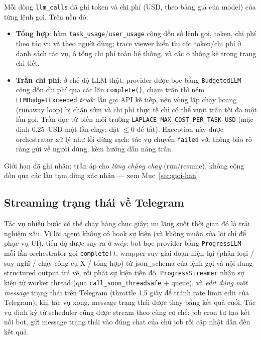 Mỗi dòng \texttt{llm\_calls} đã ghi token và chi phí (USD, theo bảng giá của
model) của từng lệnh gọi. Trên nền đó:

\begin{itemize}
  \item \textbf{Tổng hợp}: hàm \texttt{task\_usage}/\texttt{user\_usage} cộng
        dồn số lệnh gọi, token, chi phí theo tác vụ và theo người dùng; trace
        viewer hiển thị cột token/chi phí ở danh sách tác vụ, ô tổng chi phí
        toàn hệ thống, và các ô thống kê trong trang chi tiết.
  \item \textbf{Trần chi phí}: ở chế độ LLM thật, provider được bọc bằng
        \texttt{BudgetedLLM} --- cộng dồn chi phí qua các lần
        \texttt{complete()}, chạm trần thì ném \texttt{LLMBudgetExceeded}
        \emph{trước} lần gọi API kế tiếp, nên vòng lặp chạy hoang (runaway
        loop) bị chặn sớm và chi phí thực tế chỉ có thể vượt trần tối đa một
        lần gọi. Trần đọc từ biến môi trường
        \texttt{LAPLACE\_MAX\_COST\_PER\_TASK\_USD} (mặc định 0{,}25~USD một
        lần chạy; đặt $\leq 0$ để tắt). Exception này được orchestrator xử lý
        như lỗi dừng sạch: tác vụ chuyển \texttt{failed} với thông báo rõ ràng
        gửi về người dùng, kèm hướng dẫn nâng trần.
\end{itemize}

Giới hạn đã ghi nhận: trần áp cho \emph{từng chặng chạy} (run/resume), không
cộng dồn qua các lần tạm dừng xác nhận --- xem Mục~\ref{sec:gioi-han}.

\subsection{Streaming trạng thái về Telegram}
\label{sec:ky-thuat-streaming}

Tác vụ nhiều bước có thể chạy hàng chục giây; im lặng suốt thời gian đó là
trải nghiệm xấu. Vì lõi agent không có hook sự kiện (và không muốn sửa lõi
chỉ để phục vụ UI), tiến độ được suy ra ở \emph{mép}: bot bọc provider bằng
\texttt{ProgressLLM} --- mỗi lần orchestrator gọi \texttt{complete()}, wrapper
suy giai đoạn hiện tại (phân loại / suy nghĩ / chạy công cụ X / tổng hợp) từ
json\_schema của lệnh gọi và nội dung structured output trả về, rồi phát sự
kiện tiến độ. \texttt{ProgressStreamer} nhận sự kiện từ worker thread (qua
\texttt{call\_soon\_threadsafe} + queue), và \emph{edit đúng một message}
trạng thái trên Telegram (throttle 1,5 giây để tránh rate limit edit của
Telegram); khi tác vụ xong, message trạng thái được thay bằng kết quả cuối.
Tác vụ định kỳ từ scheduler cũng được stream theo cùng cơ chế: job cron tự
tạo kết nối bot, gửi message trạng thái vào đúng chat của chủ job rồi cập
nhật dần đến kết quả.

